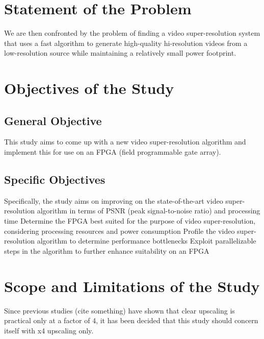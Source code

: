 \section{Statement of the Problem}

We are then confronted by the problem of finding a video super-resolution system that uses
a fast algorithm to generate high-quality hi-resolution videos from a low-resolution source 
while maintaining a relatively small power footprint.



\section{Objectives of the Study}

\subsection{General Objective}

This study aims to come up with a new video super-resolution algorithm and implement this for use on an FPGA (field programmable gate array).


\subsection{Specific Objectives}

Specifically, the study aims on improving on the state-of-the-art video super-resolution algorithm in terms of PSNR (peak signal-to-noise ratio) and processing time
Determine the FPGA best suited for the purpose of video super-resolution, considering processing resources and power consumption
Profile the video super-resolution algorithm to determine performance bottlenecks
Exploit parallelizable steps in the algorithm to further enhance suitability on an FPGA



\section{Scope and Limitations of the Study}

Since previous studies (cite something) have shown that clear upscaling is practical only at a factor of 4, 
it has been decided that this study should concern itself with x4 upscaling only.


